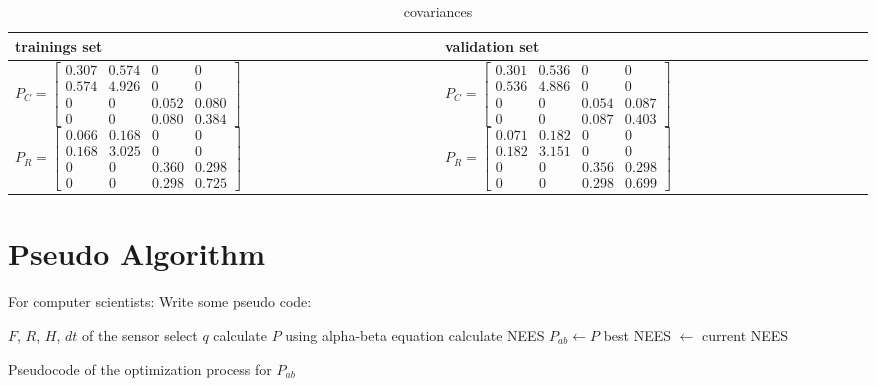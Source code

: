 \begin{table}[hbt]
\centering
\begin{small}
	\begin{tabular}{C{5.8cm}C{5.8cm}}
	\toprule
	\textbf{trainings set} & \textbf{validation set} \\
	\midrule
		$P_{C} = \begin{bmatrix}
			 0.307	&	 0.574	&	0	&	0	\\
			 0.574	&	 4.926	&	0	&	0	\\
			0	&	0	&	 0.052	&	 0.080	\\
			0	&	0	&	 0.080	&	 0.384	
		\end{bmatrix}$
		\newline
		$P_{R} = \begin{bmatrix}
			 0.066	&	 0.168	&	0	&	0	\\
			 0.168	&	 3.025	&	0	&	0	\\
			0	&	0	&	 0.360	&	 0.298	\\
			0	&	0	&	 0.298	&	 0.725	
		\end{bmatrix}$
		&
		$P_{C} = \begin{bmatrix}
			 0.301	&	 0.536	&	0	&	0	\\
			 0.536	&	 4.886	&	0	&	0	\\
			0	&	0	&	 0.054	&	 0.087	\\
			0	&	0	&	 0.087	&	 0.403	
		\end{bmatrix}$
		\newline
		$P_{R} = \begin{bmatrix}
			 0.071	&	 0.182	&	0	&	0	\\
			 0.182	&	 3.151	&	0	&	0	\\
			0	&	0	&	 0.356	&	 0.298	\\
			0	&	0	&	 0.298	&	 0.699	
		\end{bmatrix}$
\\
	\bottomrule
	\end{tabular}
\caption{covariances}
\label{tab:sol_stistical_emp_P_sim}
\end{small}
\end{table}




\section{Pseudo Algorithm}

For computer scientists: Write some pseudo code:

\begin{algorithm} 
	\begin{algorithmic}
		\Require $F$, $R$, $H$, $dt$ of the sensor
			\State select $q$
			\State calculate $P$ using alpha-beta equation
			\State calculate NEES
				\State $P_{ab} \gets P$
				\State best NEES $\gets$ current NEES
			\EndIf
		\EndWhile
		\State {}
	\end{algorithmic}
	\caption{Pseudocode of the optimization process for $P_{ab}$}
	\label{algo:opti}
\end{algorithm} 

